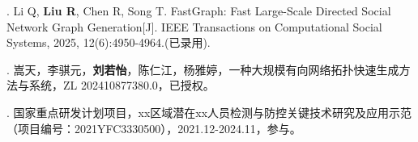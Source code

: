 


\begin{publications}

  . Li Q, \textbf{Liu R}, Chen R, Song T. FastGraph: Fast Large-Scale Directed Social Network Graph Generation[J]. IEEE Transactions on Computational Social Systems, 2025, 12(6):4950-4964.(已录用).

  . 嵩天，李骐元，\textbf{刘若怡}，陈仁江，杨雅婷，一种大规模有向网络拓扑快速生成方法与系统，ZL 202410877380.0，已授权。

  . 国家重点研发计划项目，xx区域潜在xx人员检测与防控关键技术研究及应用示范（项目编号：2021YFC3330500），2021.12-2024.11，参与。





\end{publications}
